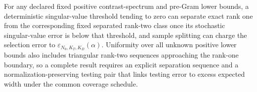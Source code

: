 For any declared fixed positive contrast-spectrum and pre-Gram lower bounds, a deterministic singular-value threshold tending to zero can separate exact rank one from the corresponding fixed separated rank-two class once its stochastic singular-value error is below that threshold, and sample splitting can charge the selection error to \(\varepsilon_{N_0,K_T,K_D}(\alpha)\). Uniformity over all unknown positive lower bounds also includes triangular rank-two sequences approaching the rank-one boundary, so a complete result requires an explicit separation sequence and a normalization-preserving testing pair that links testing error to excess expected width under the common coverage schedule.